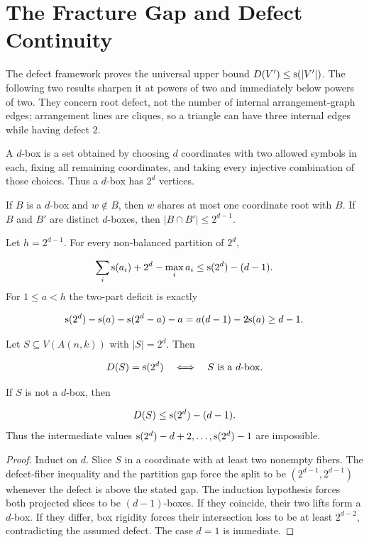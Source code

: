 \section{The Fracture Gap and Defect Continuity}\label{sec:fracture}

The defect framework proves the universal upper bound
$D(V')\le \mathrm{s}(|V'|)$.  The following two results sharpen it at powers of
two and immediately below powers of two.  They concern root defect, not the
number of internal arrangement-graph edges; arrangement lines are cliques,
so a triangle can have three internal edges while having defect $2$.

\begin{definition}\label{def:box}
A $d$-box is a set obtained by choosing $d$ coordinates with two allowed
symbols in each, fixing all remaining coordinates, and taking every injective
combination of those choices.  Thus a $d$-box has $2^d$ vertices.
\end{definition}

\begin{lemma}\label{lem:box-rigidity}
If $B$ is a $d$-box and $w\notin B$, then $w$ shares at most one coordinate
root with $B$.  If $B$ and $B'$ are distinct $d$-boxes, then
$|B\cap B'|\le 2^{d-1}$.
\end{lemma}

\begin{lemma}\label{lem:fracture-arith}
Let $h=2^{d-1}$.  For every non-balanced partition of $2^d$,

\[
\sum_i \mathrm{s}(a_i)+2^d-\max_i a_i
 \le \mathrm{s}(2^d)-(d-1).
\]
For $1\le a<h$ the two-part deficit is exactly

\[
\mathrm{s}(2^d)-\mathrm{s}(a)-\mathrm{s}(2^d-a)-a
 =a(d-1)-2\mathrm{s}(a)\ge d-1.
\]
\end{lemma}

\begin{theorem}\label{thm:fracture}
Let $S\subseteq V(A(n,k))$ with $|S|=2^d$.  Then

\[
D(S)=\mathrm{s}(2^d)
\quad\Longleftrightarrow\quad
S\text{ is a }d\text{-box}.
\]

If $S$ is not a $d$-box, then

\[
D(S)\le \mathrm{s}(2^d)-(d-1).
\]
Thus the intermediate values
$\mathrm{s}(2^d)-d+2,\ldots,\mathrm{s}(2^d)-1$ are impossible.
\end{theorem}

\begin{proof}
Induct on $d$.  Slice $S$ in a coordinate with at least two nonempty
fibers.  The defect-fiber inequality and the partition gap force the split to
be $(2^{d-1},2^{d-1})$ whenever the defect is above the stated gap.  The
induction hypothesis forces both projected slices to be $(d-1)$-boxes.  If
they coincide, their two lifts form a $d$-box.  If they differ, box rigidity
forces their intersection loss to be at least $2^{d-2}$, contradicting the
assumed defect.  The case $d=1$ is immediate.
\end{proof}

